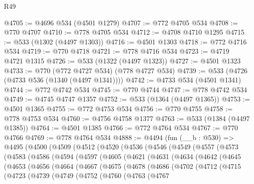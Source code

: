 \begin{lexlean}{R49}
\begin{coremodule}
@4705 := @4696 @534 (@4501 @1279)
@4707 := @772 @4705 @534
@4708 := @770 @4707
@4710 := @778 @4705 @534
@4712 := @4708 @4710 @1295
@4715 := @533 (@1302 (@4497 @1303))
@4716 := @4501 @1303
@4718 := @772 @4716 @534
@4719 := @770 @4718
@4721 := @778 @4716 @534
@4723 := @4719 @4721 @1315
@4726 := @533 (@1322 (@4497 @1323))
@4727 := @4501 @1323
@4733 := @770 (@772 @4727 @534) (@778 @4727 @534)
@4739 := @533 (@4726 (@4733 @536 (@1340 (@4497 @1341))))
@4742 := @4733 @534 (@4501 @1341)
@4744 := @772 @4742 @534
@4745 := @770 @4744
@4747 := @778 @4742 @534
@4749 := @4745 @4747 @1357
@4752 := @533 (@1364 (@4497 @1365))
@4753 := @4501 @1365
@4755 := @772 @4753 @534
@4756 := @770 @4755
@4758 := @778 @4753 @534
@4760 := @4756 @4758 @1377
@4763 := @533 (@1384 (@4497 @1385))
@4764 := @4501 @1385
@4766 := @772 @4764 @534
@4767 := @770 @4766
@4769 := @778 @4764 @534
@4888 := @4494
    (fun (__b : @530) =>
    @4495
      (@4500
        (@4509
          (@4512
            (@4520
              (@4536
                (@4546
                  (@4549
                    (@4557
                      (@4573
                        (@4583
                          (@4586
                            (@4594
                              (@4597
                                (@4605
                                  (@4621
                                    (@4631
                                      (@4634
                                        (@4642
                                          (@4645
                                            (@4653
                                              (@4656
                                                (@4664
                                                  (@4667
                                                    (@4675
                                                      (@4678
                                                        (@4686
                                                          (@4702
                                                            (@4712
                                                              (@4715
                                                                (@4723
                                                                  (@4739
                                                                    (@4749
                                                                      (@4752
                                                                        (@4760
                                                                          (@4763
                                                                            (@4767

\end{coremodule}
\end{lexlean}
